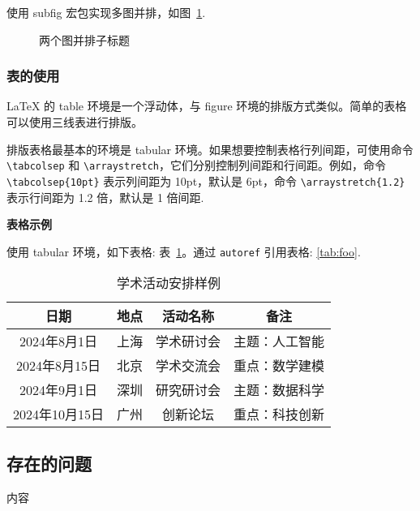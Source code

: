\documentclass[GP]{nsfc}
\begin{document}
使用 subfig 宏包实现多图并排，如图~\ref{fig:images}.
\begin{figure}[htp!]
\centering
{}
\hfill
{}
\caption{两个图并排子标题}
\label{fig:images}
\end{figure}

\subsubsection{表的使用}

LaTeX 的 table 环境是一个浮动体，与 figure 环境的排版方式类似。简单的表格可以使用三线表进行排版。

排版表格最基本的环境是 tabular 环境。如果想要控制表格行列间距，可使用命令 \verb|\tabcolsep| 和 \verb|\arraystretch|，它们分别控制列间距和行间距。例如，命令 \verb|\tabcolsep{10pt}| 表示列间距为 10pt，默认是 6pt，命令 \verb|\arraystretch{1.2}| 表示行间距为 1.2 倍，默认是 1 倍间距.

\textbf{表格示例}

使用 tabular 环境，如下表格: 表~\ref{tab:foo}。通过 \verb|autoref| 引用表格: \autoref{tab:foo}.

\begin{table}[htp!]
\centering
\setlength{\tabcolsep}{12pt}  %
\renewcommand{\arraystretch}{1.2}
\caption{学术活动安排样例}
\label{tab:foo}
\begin{tabular}{|c|c|c|c|}
\hline
\textbf{日期}  & \textbf{地点} & \textbf{活动名称} & \textbf{备注} \\ \hline
2024年8月1日      & 上海       & 学术研讨会      & 主题：人工智能 \\ \hline
2024年8月15日    & 北京       & 学术交流会      & 重点：数学建模 \\ \hline
2024年9月1日      & 深圳       & 研究研讨会      & 主题：数据科学 \\ \hline
2024年10月15日  & 广州       & 创新论坛         & 重点：科技创新 \\ \hline
\end{tabular}
\end{table}

\subsection{存在的问题}

内容

\renewcommand{\bibname}{\color{black}\normalfont\normalsize\bfseries 参考文献}
\end{document}
